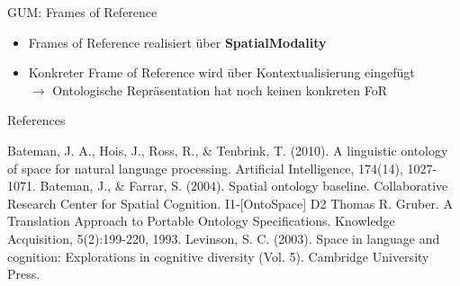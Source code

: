 \documentclass[12pt,a4paper]{beamer}
\begin{document}
\begin{frame}{GUM: Frames of Reference}
\begin{itemize}
\item Frames of Reference realisiert über \textbf{SpatialModality}
\item Konkreter Frame of Reference wird über Kontextualisierung eingefügt \\
$\to$ Ontologische Repräsentation hat noch keinen konkreten FoR
\end{itemize}
\end{frame}











\begin{frame}[allowframebreaks]{References}
\begin{thebibliography}{-}
 Bateman, J. A., Hois, J., Ross, R., \& Tenbrink, T. (2010). A linguistic ontology of space for natural language processing. Artificial Intelligence, 174(14), 1027-1071.
 Bateman, J., \& Farrar, S. (2004). Spatial ontology baseline. Collaborative Research Center for Spatial Cognition. I1-[OntoSpace] D2
 Thomas R. Gruber. A Translation Approach to Portable Ontology Specifications. Knowledge Acquisition, 5(2):199-220, 1993.
 Levinson, S. C. (2003). Space in language and cognition: Explorations in cognitive diversity (Vol. 5). Cambridge University Press.
\end{thebibliography}
\end{frame}
\end{document}
